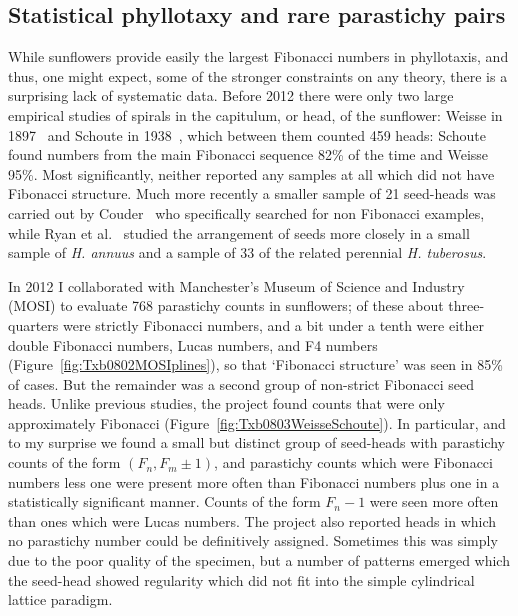   \subsection{Statistical phyllotaxy and rare parastichy pairs}
  While sunflowers provide easily the largest Fibonacci numbers in phyllotaxis, and thus, one might expect, some of the stronger
  constraints on any theory, there is a surprising lack of systematic data.
  Before 2012 there were only two large empirical studies of spirals in the capitulum, or head, of the sunflower: Weisse in 1897~\cite{weisseZahlRandbluthenCompositenkopfchen1897} and Schoute in 1938~\cite{schouteWhorledPhyllotaxisIV1938}, which between them counted 459 heads: Schoute found numbers from the main Fibonacci sequence 82\% of the time and Weisse 95\%. 
  Most significantly, neither reported any samples at all which did not have Fibonacci structure. 
  Much more recently a smaller sample of 21 seed-heads was carried out 
  by Couder~\cite{couderInitialTransitionsOrder1998} who specifically searched for non Fibonacci examples, while
  Ryan et al.~\cite{ryanQuantitativeAnalysisSunflower1990} studied the arrangement of seeds more closely in a small sample of \emph{H. annuus} and a sample of 33 of the
  related perennial \emph{H. tuberosus}. 
  
 In 2012 I collaborated with Manchester's Museum of Science and Industry (MOSI) \autocite{swintonNovelFibonacciNonFibonacci2016} to evaluate 768 parastichy counts in sunflowers; of these about three-quarters were strictly 
 Fibonacci numbers, and a bit under a tenth
  were either  double Fibonacci numbers, Lucas numbers, and F4 numbers (Figure~\ref{fig:Txb0802MOSIplines}), so that `Fibonacci structure' was seen in 85\% of cases. 
 But the remainder was a second group of non-strict Fibonacci seed heads.  Unlike previous studies, the project  found counts that were only approximately Fibonacci (Figure~\ref{fig:Txb0803WeisseSchoute}).
  In particular, and to my surprise we found a small but distinct group of seed-heads with parastichy counts of the form $(F_n,F_{m}\pm 1)$, and parastichy counts which were  Fibonacci numbers 
  less one  were present more often than   Fibonacci numbers plus one in a statistically significant manner. Counts of the form $F_n-1$ were seen more often than ones which were Lucas numbers.
  The project also reported heads in which no parastichy number could be definitively assigned. Sometimes this was simply due to the poor quality of the specimen, but a number of patterns emerged which the seed-head showed regularity which did not fit into the simple cylindrical lattice paradigm. 
  

